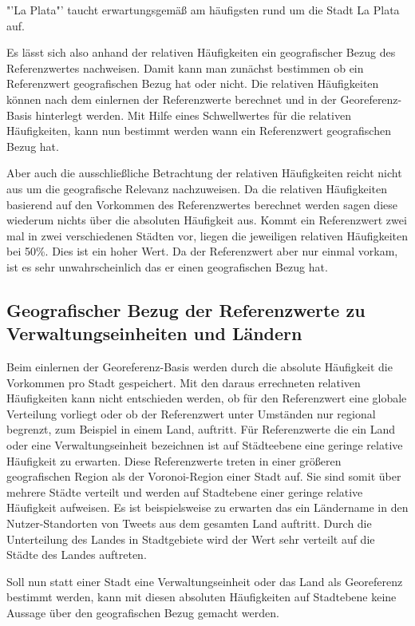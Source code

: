 				"'La Plata"' taucht erwartungsgemäß am häufigsten rund um die Stadt La Plata auf.  

				Es lässt sich also anhand der relativen Häufigkeiten ein geografischer Bezug des Referenzwertes nachweisen.
				Damit kann man zunächst bestimmen ob ein Referenzwert geografischen Bezug hat oder nicht.
				Die relativen Häufigkeiten können nach dem einlernen der Referenzwerte berechnet und in der Georeferenz-Basis hinterlegt werden.
				Mit Hilfe eines Schwellwertes für die relativen Häufigkeiten, kann nun bestimmt werden wann ein Referenzwert geografischen Bezug hat.

				Aber auch die ausschließliche Betrachtung der relativen Häufigkeiten reicht nicht aus um die geografische Relevanz nachzuweisen.
				Da die relativen Häufigkeiten basierend auf den Vorkommen des Referenzwertes berechnet werden sagen diese wiederum nichts über die absoluten Häufigkeit aus. 
				Kommt ein Referenzwert zwei mal in zwei verschiedenen Städten vor, liegen die jeweiligen relativen Häufigkeiten bei 50\%.
				Dies ist ein hoher Wert.
				Da der Referenzwert aber nur einmal vorkam, ist es sehr unwahrscheinlich das er einen geografischen Bezug hat.   

		\subsection{Geografischer Bezug der Referenzwerte zu Verwaltungseinheiten und Ländern} 

			Beim einlernen der Georeferenz-Basis werden durch die absolute Häufigkeit die Vorkommen pro Stadt gespeichert.
			Mit den daraus errechneten relativen Häufigkeiten kann nicht entschieden werden, ob für den Referenzwert eine globale Verteilung vorliegt oder ob der Referenzwert unter Umständen nur regional begrenzt, zum Beispiel in einem Land, auftritt.
			Für Referenzwerte die ein Land oder eine Verwaltungseinheit bezeichnen ist auf Städteebene eine geringe relative Häufigkeit zu erwarten.
			Diese Referenzwerte treten in einer größeren geografischen Region als der Voronoi-Region einer Stadt auf.
			Sie sind somit über mehrere Städte verteilt und werden auf Stadtebene einer geringe relative Häufigkeit aufweisen.
			Es ist beispielsweise zu erwarten das ein Ländername in den Nutzer-Standorten von Tweets aus dem gesamten Land auftritt.
			Durch die Unterteilung des Landes in Stadtgebiete wird der Wert sehr verteilt auf die Städte des Landes auftreten.

			Soll nun statt einer Stadt eine Verwaltungseinheit oder das Land als Georeferenz bestimmt werden, kann mit diesen absoluten Häufigkeiten auf Stadtebene keine Aussage über den geografischen Bezug gemacht werden. 
			

